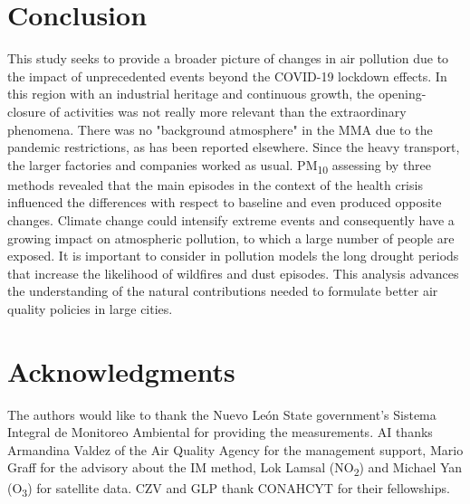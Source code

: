 \documentclass[preprint,12pt]{elsarticle}
\begin{document}
\section{Conclusion}
This study seeks to provide a broader picture of changes in air pollution due to the impact of unprecedented events beyond the COVID-19 lockdown effects. In this region with an industrial heritage and continuous growth, the opening-closure of activities was not really more relevant than the extraordinary phenomena. There was no "background atmosphere" in the MMA due to the pandemic restrictions, as has been reported elsewhere. Since the heavy transport, the larger factories and companies worked as usual. PM\textsubscript{10} assessing by three methods revealed that the main episodes in the context of the health crisis influenced the differences with respect to baseline and even produced opposite changes. Climate change could intensify extreme events and consequently have a growing impact on atmospheric pollution, to which a large number of people are exposed. It is important to consider in pollution models the long drought periods that increase the likelihood of wildfires and dust episodes. This analysis advances the understanding of the natural contributions needed to formulate better air quality policies in large cities.
\section{Acknowledgments}
The authors would like to thank the Nuevo León State government’s Sistema Integral de Monitoreo Ambiental for providing the measurements. AI
thanks Armandina Valdez of the Air Quality Agency for the management
support, Mario Graff for the advisory about the IM method, Lok Lamsal (NO\textsubscript{2}) and Michael Yan (O\textsubscript{3}) for satellite data. CZV and GLP thank CONAHCYT for their fellowships.






\end{document}
